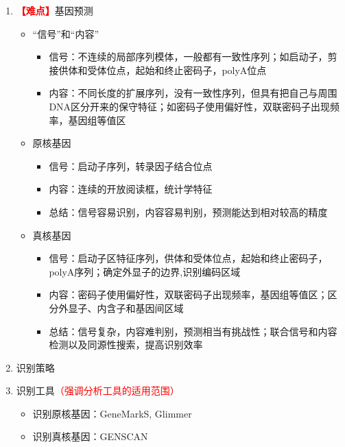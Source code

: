 \documentclass{TIJMUjiaoanLL}
\begin{document}
\begin{enumerate}
  \item \textcolor{red}{\textbf{【难点】}}基因预测
    \begin{itemize}
      \item “信号”和“内容”
	\begin{itemize}
	  \item 信号：不连续的局部序列模体，一般都有一致性序列；如启动子，剪接供体和受体位点，起始和终止密码子，polyA位点
	  \item 内容：不同长度的扩展序列，没有一致性序列，但具有把自己与周围DNA区分开来的保守特征；如密码子使用偏好性，双联密码子出现频率，基因组等值区
	\end{itemize}
      \item 原核基因
	\begin{itemize}
	  \item 信号：启动子序列，转录因子结合位点
	  \item 内容：连续的开放阅读框，统计学特征
	  \item 总结：信号容易识别，内容容易判别，预测能达到相对较高的精度
	\end{itemize}
      \item 真核基因
	\begin{itemize}
	  \item 信号：启动子区特征序列，供体和受体位点，起始和终止密码子，polyA序列；确定外显子的边界,识别编码区域
	  \item 内容：密码子使用偏好性，双联密码子出现频率，基因组等值区；区分外显子、内含子和基因间区域
	  \item 总结：信号复杂，内容难判别，预测相当有挑战性；联合信号和内容检测以及同源性搜索，提高识别效率
	\end{itemize}
    \end{itemize}
  \item 识别策略
  \item 识别工具\textcolor{red}{（强调分析工具的适用范围）}
    \begin{itemize}
      \item 识别原核基因：GeneMarkS, Glimmer
      \item 识别真核基因：GENSCAN
    \end{itemize}
\end{enumerate}
\end{document}
